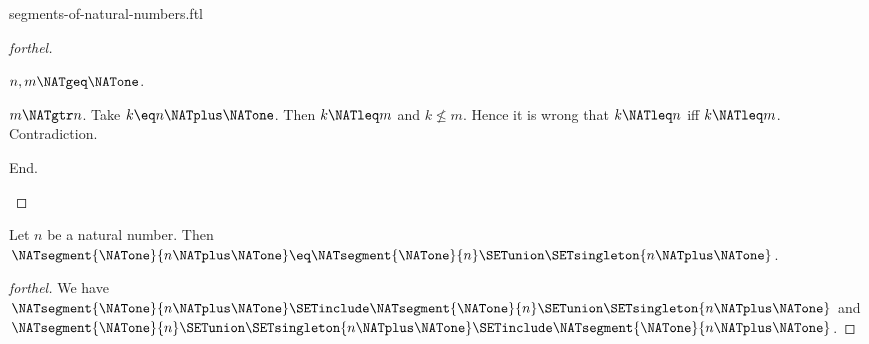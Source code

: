 \documentclass{naproche-library}
\begin{document}
\begin{smodule}[title=Segments of the Natural Numbers]{segments-of-natural-numbers.ftl}
\begin{proof}[forthel]
\begin{case}{$n, m \NATgeq \NATone$.}
      \begin{case}{$m \NATgtr n$.}
        Take $k \eq n \NATplus \NATone$.
        Then $k \NATleq m$ and $k \nleq m$.
        Hence it is wrong that $k \NATleq n$ iff $k \NATleq m$.
        Contradiction.
      \end{case}
    End.
  \end{case}
\end{proof}

\begin{proposition}[forthel,id=FOUNDATIONS_14_658708738605056]
  Let $n$ be a natural number.
  Then $\NATsegment{\NATone}{n \NATplus \NATone} \eq \NATsegment{\NATone}{n} \SETunion \SETsingleton{n \NATplus \NATone}$.
\end{proposition}
\begin{proof}[forthel]
  We have
  $\NATsegment{\NATone}{n \NATplus \NATone} \SETinclude \NATsegment{\NATone}{n} \SETunion \SETsingleton{n \NATplus \NATone}$ and $\NATsegment{\NATone}{n} \SETunion \SETsingleton{n \NATplus \NATone} \SETinclude \NATsegment{\NATone}{n \NATplus \NATone}$.
\end{proof}
\end{smodule}
\end{document}
